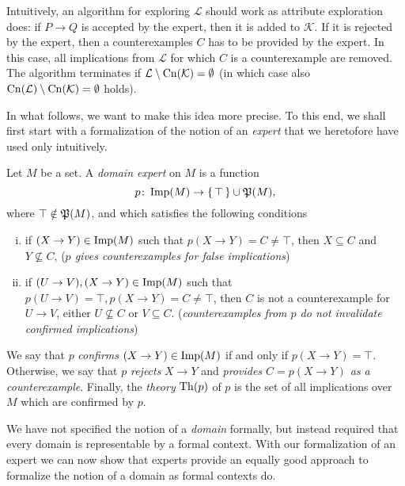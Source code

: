 Intuitively, an algorithm for exploring $\mathcal{L}$ should work as attribute exploration
does: if $P \to Q$ is accepted by the expert, then it is added to $\mathcal{K}$.  If it is
rejected by the expert, then a counterexamples $C$ has to be provided by the expert.  In
this case, all implications from $\mathcal{L}$ for which $C$ is a counterexample are
removed.  The algorithm terminates if $\mathcal{L} \setminus \operatorname{Cn}(\mathcal{K}) = \emptyset$
(in which case also $\operatorname{Cn}(\mathcal{L}) \setminus \operatorname{Cn}(\mathcal{K}) = \emptyset$ holds).

In what follows, we want to make this idea more precise.  To this end, we shall first
start with a formalization of the notion of an \emph{expert} that we heretofore have used
only intuitively.

\begin{Definition}
  \label{def:domain-expert}
  Let $M$ be a set.  A \emph{domain expert} on $M$ is a function
  \begin{equation*}
    p \colon \operatorname{Imp}(M) \to {\ensuremath{\{\, \top \,\}}} \cup {\ensuremath{\mathfrak{P}(M)}},
  \end{equation*}
  where $\top \notin {\ensuremath{\mathfrak{P}(M)}}$, and which satisfies the following conditions
  \begin{enumerate}[i. ]
  \item if $(X \to Y) \in \operatorname{Imp}(M)$ such that $p(X \to Y) = C \neq \top$, then $ X
    \subseteq C$ and $Y \not\subseteq C$, (\emph{$p$ gives counterexamples for false
      implications})
  \item if $(U \to V), (X \to Y) \in \operatorname{Imp}(M)$ such that $p(U \to V) = \top, p(X \to Y) = C
    \neq \top$, then $C$ is not a counterexample for $U \to V$, \ie either $U
    \not\subseteq C$ or $V \subseteq C$. (\emph{counterexamples from $p$ do not invalidate
      confirmed implications})
  \end{enumerate}
  We say that $p$ \emph{confirms} $(X \to Y) \in \operatorname{Imp}(M)$ if and only if $p(X \to Y) =
  \top$.  Otherwise, we say that $p$ \emph{rejects} $X \to Y$ and \emph{provides $C = p(X
    \to Y)$ as a counterexample}.  Finally, the \emph{theory} $\operatorname{Th}(p)$ of $p$ is the set
  of all implications over $M$ which are confirmed by $p$.
\end{Definition}

We have not specified the notion of a \emph{domain} formally, but instead required that
every domain is representable by a formal context.  With our formalization of an expert we
can now show that experts provide an equally good approach to formalize the notion of a
domain as formal contexts do.

